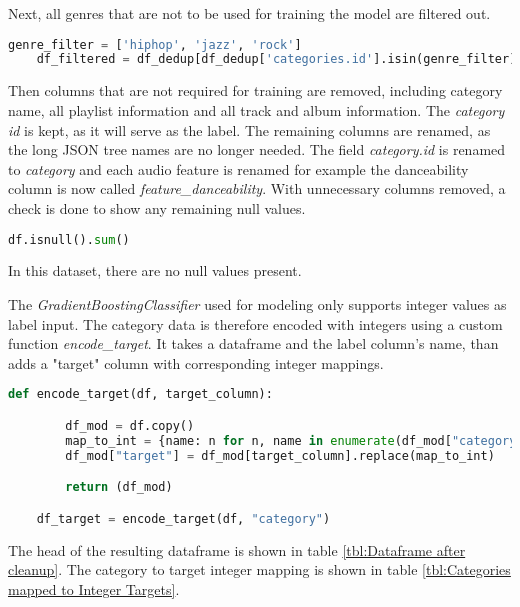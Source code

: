 Next, all genres that are not to be used for training the model are filtered out.

\begin{lstlisting}[language=Python]
    genre_filter = ['hiphop', 'jazz', 'rock']
    df_filtered = df_dedup[df_dedup['categories.id'].isin(genre_filter)]
\end{lstlisting}

Then columns that are not required for training are removed, including category name, all playlist information and
all track and album information. The \emph{category id} is kept, as it will serve as the label.
The remaining columns are renamed, as the long JSON tree names are no longer needed.
The field \emph{category.id} is renamed to \emph{category} and each audio feature is renamed for example 
the danceability column is now called \emph{feature\_danceability}.
With unnecessary columns removed, a check is done to show any remaining null values.

\begin{lstlisting}[language=Python]
    df.isnull().sum()
\end{lstlisting}

In this dataset, there are no null values present.

The \emph{GradientBoostingClassifier} used for modeling only supports integer values as label input.
The category data is therefore encoded with integers using a custom function \emph{encode\_target}.
It takes a dataframe and the label column's name, than adds a "target" column with corresponding integer mappings.

\begin{lstlisting}[language=Python]
    def encode_target(df, target_column):

        df_mod = df.copy()
        map_to_int = {name: n for n, name in enumerate(df_mod["category"].unique())}
        df_mod["target"] = df_mod[target_column].replace(map_to_int)

        return (df_mod)

    df_target = encode_target(df, "category")
\end{lstlisting}

The head of the resulting dataframe is shown in table \ref{tbl:Dataframe after cleanup}.
The category to target integer mapping is shown in table \ref{tbl:Categories mapped to Integer Targets}.

